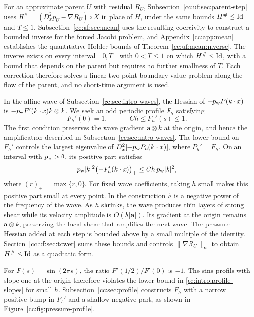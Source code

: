 For an approximate parent $U$ with residual $R_U$,
Subsection~\ref{cc:uf:sec:parent-step} uses
$H^\#=(D_x^2p_U-\nabla R_U)\circ X$ in place of $H$, under the same
bounds $H^\#\le\operatorname{Id}$ and $T\le1$. Subsection~\ref{cc:uf:sec:mean} uses
the resulting coercivity to construct a bounded inverse for the forced
Jacobi problem, and
Appendix~\ref{cc:app:mean} establishes the quantitative H\"older bounds
of Theorem~\ref{cc:uf:mean:inverse}. The inverse exists on every
interval $[0,T]$ with $0<T\le1$ on which $H^\#\le\operatorname{Id}$, with a bound that
depends on the parent but requires no further smallness of $T$. Each
correction therefore solves a linear two-point boundary value problem
along the flow of the parent, and no short-time argument is used.

In the affine wave of Subsection~\ref{cc:sec:intro-waves}, the Hessian of
$-p_{\rm w}P(k\cdot x)$ is $-p_{\rm w}F'(k\cdot x)k\otimes k$.
We seek an odd periodic profile
$F_h$ satisfying
\begin{equation}\label{cc:intro:profile-slopes}
 F_h'(0)=1,\qquad -Ch\le F_h'(s)\le1 .
\end{equation}
The first condition preserves the wave gradient $\mathbf a\otimes k$
at the origin, and hence the amplification described in Subsection~\ref{cc:sec:intro-waves}.
The lower bound on $F_h'$ controls the largest eigenvalue of
$D_x^2[-p_{\rm w}P_h(k\cdot x)]$, where $P_h'=F_h$. On an interval
with $p_{\rm w}>0$, its positive part satisfies
\begin{equation}\label{cc:intro:profile-curvature}
 p_{\rm w}|k|^2\bigl(-F_h'(k\cdot x)\bigr)_+
 \le Ch\,p_{\rm w}|k|^2,
\end{equation}
where $(r)_+=\max\{r,0\}$. For fixed wave coefficients, taking $h$ small
makes this positive part small at every point. In the construction $h$
is a negative power of the frequency of the wave. As $h$ shrinks, the
wave produces thin layers of strong shear while its velocity amplitude
is $O(h|\mathbf a|)$. Its gradient at the origin remains
$\mathbf a\otimes k$, preserving the local shear that amplifies the
next wave. The pressure Hessian added at each step is bounded above
by a small multiple of the identity. Section~\ref{cc:uf:sec:tower}
sums these bounds and controls $\|\nabla R_U\|_\infty$ to obtain
$H^\#\le\operatorname{Id}$ as a quadratic form.

For $F(s)=\sin(2\pi s)$, the ratio $F'(1/2)/F'(0)$ is $-1$.
The sine profile with slope one at the origin therefore violates the
lower bound in \eqref{cc:intro:profile-slopes} for small $h$.
Subsection~\ref{cc:sec:profile} constructs $F_h$ with a narrow positive
bump in $F_h'$ and a shallow negative part, as shown in
Figure~\ref{cc:fig:pressure-profile}.

